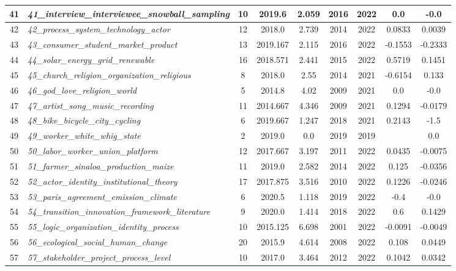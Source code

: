\documentclass[12pt]{article}
\begin{document}
\begin{landscape}
\begin{scriptsize}
\begin{longtable}{|>{\scriptsize}c|p{6cm}|c|c|c|c|c|c|c|}
41 & \textit{41\_interview\_interviewee\_snowball\_sampling} & 10 & 2019.6 & 2.059 & 2016 & 2022 & 0.0 & -0.0 \\ \hline
42 & \textit{42\_process\_system\_technology\_actor} & 12 & 2018.0 & 2.739 & 2014 & 2022 & 0.0833 & 0.0039 \\ \hline
43 & \textit{43\_consumer\_student\_market\_product} & 13 & 2019.167 & 2.115 & 2016 & 2022 & -0.1553 & -0.2333 \\ \hline
44 & \textit{44\_solar\_energy\_grid\_renewable} & 16 & 2018.571 & 2.441 & 2015 & 2022 & 0.5719 & 0.1451 \\ \hline
45 & \textit{45\_church\_religion\_organization\_religious} & 8 & 2018.0 & 2.55 & 2014 & 2021 & -0.6154 & 0.133 \\ \hline
46 & \textit{46\_god\_love\_religion\_world} & 5 & 2014.8 & 4.02 & 2009 & 2021 & 0.0 & -0.0 \\ \hline
47 & \textit{47\_artist\_song\_music\_recording} & 11 & 2014.667 & 4.346 & 2009 & 2021 & 0.1294 & -0.0179 \\ \hline
48 & \textit{48\_bike\_bicycle\_city\_cycling} & 6 & 2019.667 & 1.247 & 2018 & 2021 & 0.2143 & -1.5 \\ \hline
49 & \textit{49\_worker\_white\_whig\_state} & 2 & 2019.0 & 0.0 & 2019 & 2019 &  & 0.0 \\ \hline
50 & \textit{50\_labor\_worker\_union\_platform} & 12 & 2017.667 & 3.197 & 2011 & 2022 & 0.0435 & -0.0075 \\ \hline
51 & \textit{51\_farmer\_sinaloa\_production\_maize} & 11 & 2019.0 & 2.582 & 2014 & 2022 & 0.125 & -0.0356 \\ \hline
52 & \textit{52\_actor\_identity\_institutional\_theory} & 17 & 2017.875 & 3.516 & 2010 & 2022 & 0.1226 & -0.0246 \\ \hline
53 & \textit{53\_paris\_agreement\_emission\_climate} & 6 & 2020.5 & 1.118 & 2019 & 2022 & -0.4 & -0.0 \\ \hline
54 & \textit{54\_transition\_innovation\_framework\_literature} & 9 & 2020.0 & 1.414 & 2018 & 2022 & 0.6 & 0.1429 \\ \hline
55 & \textit{55\_logic\_organization\_identity\_process} & 10 & 2015.125 & 6.698 & 2001 & 2022 & -0.0091 & -0.0049 \\ \hline
56 & \textit{56\_ecological\_social\_human\_change} & 20 & 2015.9 & 4.614 & 2008 & 2022 & 0.108 & 0.0449 \\ \hline
57 & \textit{57\_stakeholder\_project\_process\_level} & 10 & 2017.0 & 3.464 & 2012 & 2022 & 0.1042 & 0.0342 \\ \hline

\end{longtable}
\end{scriptsize}
\end{landscape}
\end{document}
